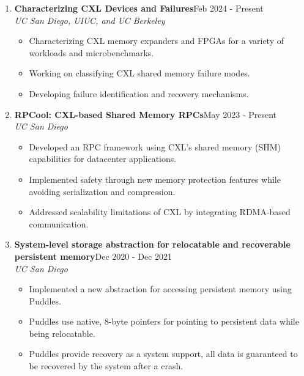 \documentclass{article}
\newlength{\projitemsep}
\begin{document}
\begin{enumerate}
        \item \textbf{Characterizing CXL Devices and Failures}\hfill{}Feb 2024 - Present\\
    \textit{UC San Diego, UIUC, and UC Berkeley}\vspace{-0.15cm}
    \begin{itemize}[itemsep=\projitemsep]
            \item Characterizing CXL memory expanders and FPGAs for a variety of workloads and microbenchmarks.
            \item Working on classifying CXL shared memory failure modes.
            \item Developing failure identification and recovery mechanisms.
    \end{itemize}
        \item \textbf{RPCool: CXL-based Shared Memory RPCs}\hfill{}May 2023 - Present\\
    \textit{UC San Diego}\vspace{-0.15cm}
    \begin{itemize}[itemsep=\projitemsep]
            \item Developed an RPC framework using CXL's shared memory (SHM) capabilities for datacenter applications.
            \item Implemented safety through new memory protection features while avoiding serialization and compression.
            \item Addressed scalability limitations of CXL by integrating RDMA-based communication. \end{itemize}
        \item \textbf{System-level storage abstraction for relocatable and recoverable persistent memory}\hfill{}Dec 2020 - Dec 2021\\
    \textit{UC San Diego}\vspace{-0.15cm}
    \begin{itemize}[itemsep=\projitemsep]
            \item Implemented a new abstraction for accessing persistent memory using Puddles.
            \item Puddles use native, 8-byte pointers for pointing to persistent data while being relocatable.
            \item Puddles provide recovery as a system support, all data is guaranteed to be recovered by the system after a crash.
    \end{itemize}


\end{enumerate}
\end{document}
